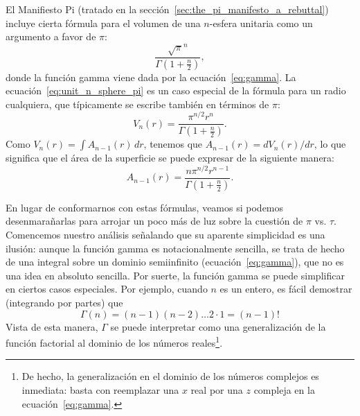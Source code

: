 El Manifiesto Pi (tratado en la sección~\ref{sec:the_pi_manifesto_a_rebuttal}) incluye cierta fórmula para el volumen de una $n$-esfera unitaria como un argumento a favor de $\pi$:
\begin{equation}
\label{eq:unit_n_sphere_pi}
\frac{\sqrt{\pi}^{n} }{\Gamma(1 + \frac{n}{2})},
\end{equation}
donde la función gamma viene dada por la ecuación~\eqref{eq:gamma}. La ecuación~\eqref{eq:unit_n_sphere_pi} es un caso especial de la fórmula para un radio cualquiera, que típicamente se escribe también en términos de $\pi$:
\begin{equation}
\label{eq:n_sphere_pi}
V_n(r) = \frac{\pi^{n/2} r^n}{\Gamma(1 + \frac{n}{2})}.
\end{equation}
Como $V_n(r) = \int A_{n-1}(r)\,dr$, tenemos que $A_{n-1}(r) = dV_n(r)/dr$, lo que significa que el área de la superficie se puede expresar de la siguiente manera:
\begin{equation}
\label{eq:n_sphere_pi_r}
A_{n-1}(r) = \frac{n \pi^{n/2} r^{n-1}}{\Gamma(1 + \frac{n}{2})}.
\end{equation}

En lugar de conformarnos con estas fórmulas, veamos si podemos desenmarañarlas para arrojar un poco más de luz sobre la cuestión de $\pi$ vs. $\tau$. Comencemos nuestro análisis señalando que su aparente simplicidad es una ilusión: aunque la función gamma es notacionalmente sencilla, se trata de hecho de una integral sobre un dominio semiinfinito (ecuación~\eqref{eq:gamma}), que no es una idea en absoluto sencilla. Por suerte, la función gamma se puede simplificar en ciertos casos especiales. Por ejemplo, cuando $n$ es un entero, es fácil demostrar (integrando por partes) que
\[
\Gamma(n) = (n-1)(n-2)\ldots 2\cdot 1 = (n-1)!
\]
Vista de esta manera, $\Gamma$ se puede interpretar como una generalización de la función factorial al dominio de los números reales\footnote{De hecho, la generalización en el dominio de los números complejos es inmediata: basta con reemplazar una $x$ real por una $z$ compleja en la ecuación~\eqref{eq:gamma}.}.

